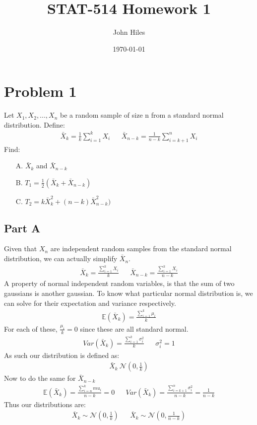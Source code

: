 \documentclass{article}
\title{STAT-514 Homework 1}
\author{John Hiles}
\date\today
\begin{document}
\maketitle %

\section*{Problem 1}
Let $X_1, X_2,..., X_n$ be a random sample of size n from a standard normal distribution. Define:
\begin{align*}
\bar{X}_k = \frac{1}{k} \sum_{i=1}^{k} X_i && \bar{X}_{n-k} = \frac{1}{n-k} \sum_{i=k+1}^{n} X_i 
\end{align*}
Find:
\begin{enumerate}
\item[A.] $\bar{X}_k$ and $\bar{X}_{n-k}$
\item[B.] $T_1 = \frac{1}{2} (\bar{X}_k + \bar{X}_{n-k})$
\item[C.] $T_2 = k\bar{X}_{k}^2 + (n-k) \bar{X}_{n-k}^{2})$
\end{enumerate}
\subsection*{Part A}
Given that $X_n$ are independent random samples from the standard normal distribution, we can actually simplify $\bar{X}_n$. 
\begin{align*}
\bar{X}_k = \frac{\sum_{i=1}^{k} X_i}{k} && \bar{X}_{n-k} = \frac{\sum_{i=1}^{k} X_i}{n-k}
\end{align*}
A property of normal independent random variables, is that the sum of two gaussians is another gaussian. To know what particular normal distribution is, we can solve for their expectation and variance respectively.
\begin{align*}
\mathbb{E}(\bar{X}_k) = \frac{\sum_{i=1}^{k} \mu_i}{k}
\end{align*}
For each of these, $\frac{\mu_i}{k} = 0$ since these are all standard normal.
\begin{align*}
Var(\bar{X}_k) = \frac{\sum_{i=1}^{k} \sigma^2_i}{k} && \sigma_i^2 = 1
\end{align*}
As such our distribution is defined as:
\begin{align*}
\bar{X}_k ~ \mathcal{N}(0,\frac{1}{k})
\end{align*}
Now to do the same for $\bar{X}_{n-k}$
\begin{align*}
\mathbb{E}(\bar{X}_k) = \frac{\sum_{i=n}^{k} mu_i}{n-k} = 0 && Var(\bar{X}_k) = \frac{\sum_{i=k+1}^{n} \sigma^2_i}{n-k} = \frac{1}{n-k}
\end{align*}
Thus our distributions are:
\begin{align*}
\boxed{\bar{X}_k \sim \mathcal{N}(0,\frac{1}{k})} && \boxed{\bar{X}_k \sim \mathcal{N}(0,\frac{1}{n-k})}
\end{align*}
\end{document}
